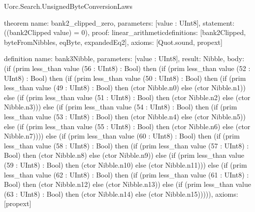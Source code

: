 \begin{lexlean}{Uorc.Search.UnsignedByteConversionLaws}
\begin{semanticmodule}
theorem{
  name: bank2_clipped_zero,
  parameters: [value : UInt8],
  statement: ((bank2Clipped value) = 0),
  proof: linear_arithmetic{definitions: [bank2Clipped, byteFromNibbles, eqByte, expandedEq2]},
  axioms: [Quot.sound, propext]
}

definition{
  name: bank3Nibble,
  parameters: [value : UInt8],
  result: Nibble,
  body: (if (prim less_than value (56 : UInt8) : Bool) then (if (prim less_than value (52 : UInt8) : Bool) then (if (prim less_than value (50 : UInt8) : Bool) then (if (prim less_than value (49 : UInt8) : Bool) then (ctor Nibble.n0) else (ctor Nibble.n1)) else (if (prim less_than value (51 : UInt8) : Bool) then (ctor Nibble.n2) else (ctor Nibble.n3))) else (if (prim less_than value (54 : UInt8) : Bool) then (if (prim less_than value (53 : UInt8) : Bool) then (ctor Nibble.n4) else (ctor Nibble.n5)) else (if (prim less_than value (55 : UInt8) : Bool) then (ctor Nibble.n6) else (ctor Nibble.n7)))) else (if (prim less_than value (60 : UInt8) : Bool) then (if (prim less_than value (58 : UInt8) : Bool) then (if (prim less_than value (57 : UInt8) : Bool) then (ctor Nibble.n8) else (ctor Nibble.n9)) else (if (prim less_than value (59 : UInt8) : Bool) then (ctor Nibble.n10) else (ctor Nibble.n11))) else (if (prim less_than value (62 : UInt8) : Bool) then (if (prim less_than value (61 : UInt8) : Bool) then (ctor Nibble.n12) else (ctor Nibble.n13)) else (if (prim less_than value (63 : UInt8) : Bool) then (ctor Nibble.n14) else (ctor Nibble.n15))))),
  axioms: [propext]
}


\end{semanticmodule}
\end{lexlean}
